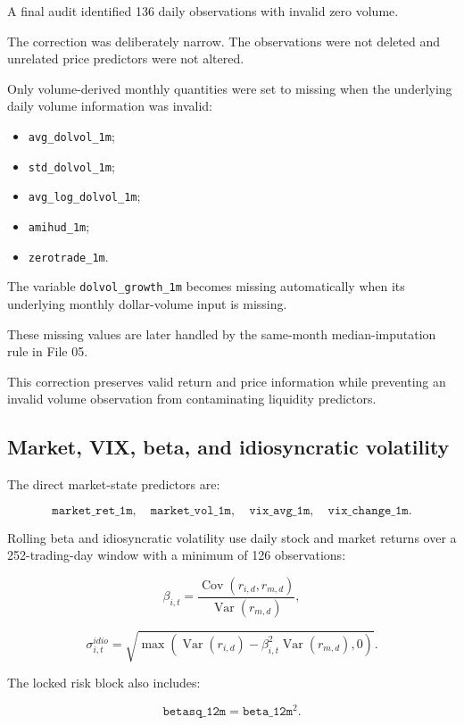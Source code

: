 \documentclass[11pt,a4paper]{article}
\newcommand{\code}[1]{\texttt{#1}}
\begin{document}
A final audit identified 136 daily observations with invalid zero volume.

The correction was deliberately narrow. The observations were not deleted and
unrelated price predictors were not altered.

Only volume-derived monthly quantities were set to missing when the underlying
daily volume information was invalid:

\begin{itemize}
  \item \code{avg\_dolvol\_1m};
  \item \code{std\_dolvol\_1m};
  \item \code{avg\_log\_dolvol\_1m};
  \item \code{amihud\_1m};
  \item \code{zerotrade\_1m}.
\end{itemize}

The variable \code{dolvol\_growth\_1m} becomes missing automatically when its
underlying monthly dollar-volume input is missing.

These missing values are later handled by the same-month median-imputation rule
in File 05.

This correction preserves valid return and price information while preventing
an invalid volume observation from contaminating liquidity predictors.

\subsection{Market, VIX, beta, and idiosyncratic volatility}

The direct market-state predictors are:

\[
\code{market\_ret\_1m},
\quad
\code{market\_vol\_1m},
\quad
\code{vix\_avg\_1m},
\quad
\code{vix\_change\_1m}.
\]

Rolling beta and idiosyncratic volatility use daily stock and market returns
over a 252-trading-day window with a minimum of 126 observations:

\[
  \beta_{i,t}
  =
  \frac{
    \operatorname{Cov}(r_{i,d},r_{m,d})
  }{
    \operatorname{Var}(r_{m,d})
  },
\]

\[
  \sigma^{idio}_{i,t}
  =
  \sqrt{
    \max
    \left(
      \operatorname{Var}(r_{i,d})
      -
      \beta_{i,t}^{2}
      \operatorname{Var}(r_{m,d}),
      0
    \right)
  }.
\]

The locked risk block also includes:

\[
\code{betasq\_12m}
=
\code{beta\_12m}^{2}.
\]
\end{document}
